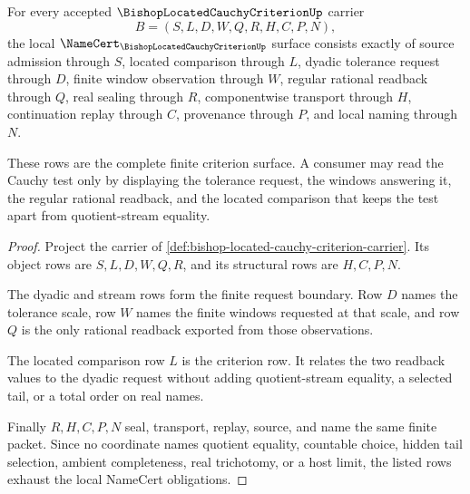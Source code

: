 \begin{theorem}
\label{thm:bishop-located-cauchy-criterion-namecert-obligations}
For every accepted $\BishopLocatedCauchyCriterionUp$ carrier
$$
B=(S,L,D,W,Q,R,H,C,P,N),
$$
the local $\NameCert_{\BishopLocatedCauchyCriterionUp}$ surface consists exactly of source admission through $S$, located comparison through $L$, dyadic tolerance request through $D$, finite window observation through $W$, regular rational readback through $Q$, real sealing through $R$, componentwise transport through $H$, continuation replay through $C$, provenance through $P$, and local naming through $N$.

These rows are the complete finite criterion surface. A consumer may read the Cauchy test only by displaying the tolerance request, the windows answering it, the regular rational readback, and the located comparison that keeps the test apart from quotient-stream equality.
\end{theorem}
\begin{proof}
Project the carrier of \autoref{def:bishop-located-cauchy-criterion-carrier}. Its object rows are $S,L,D,W,Q,R$, and its structural rows are $H,C,P,N$.

The dyadic and stream rows form the finite request boundary. Row $D$ names the tolerance scale, row $W$ names the finite windows requested at that scale, and row $Q$ is the only rational readback exported from those observations.

The located comparison row $L$ is the criterion row. It relates the two readback values to the dyadic request without adding quotient-stream equality, a selected tail, or a total order on real names.

Finally $R,H,C,P,N$ seal, transport, replay, source, and name the same finite packet. Since no coordinate names quotient equality, countable choice, hidden tail selection, ambient completeness, real trichotomy, or a host limit, the listed rows exhaust the local NameCert obligations.
\end{proof}

